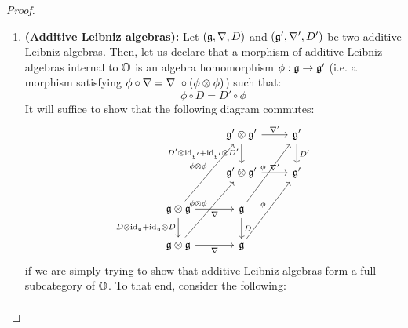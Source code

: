                     \begin{proof}
                        \noindent
                        \begin{enumerate}
                            \item \textbf{(Additive Leibniz algebras):} Let $(\g, \nabla, D)$ and $(\g', \nabla', D')$ be two additive Leibniz algebras. Then, let us declare that a morphism of additive Leibniz algebras internal to $\O$ is an algebra homomorphism $\phi: \g \to \g'$ (i.e. a morphism satisfying $\phi \circ \nabla = \nabla\ \circ (\phi \tensor \phi)$) such that:
                                $$\phi \circ D = D' \circ \phi$$
                            It will suffice to show that the following diagram commutes:
                                $$
                                    \begin{tikzcd}
                                    	& {\g' \tensor \g'} & {\g'} \\
                                    	& {\g' \tensor \g'} & {\g'} \\
                                    	{\g \tensor \g} & {\g} \\
                                    	{\g \tensor \g} & {\g}
                                    	\arrow["{\phi \tensor \phi}", from=3-1, to=1-2]
                                    	\arrow["{\phi}", from=3-2, to=1-3]
                                    	\arrow["{\phi}", from=4-2, to=2-3]
                                    	\arrow["{D'}", from=1-3, to=2-3]
                                    	\arrow["{\nabla'}", from=1-2, to=1-3]
                                    	\arrow["{D' \tensor \id_{\g'} + \id_{\g'} \tensor D'}"', from=1-2, to=2-2]
                                    	\arrow["{\nabla'}", from=2-2, to=2-3]
                                    	\arrow["{D}", from=3-2, to=4-2]
                                    	\arrow["{D \tensor \id_{\g} + \id_{\g} \tensor D}"', from=3-1, to=4-1]
                                    	\arrow["{\nabla}"', from=4-1, to=4-2]
                                    	\arrow["{\nabla}"', from=3-1, to=3-2]
                                    	\arrow["{\phi \tensor \phi}", from=4-1, to=2-2]
                                    \end{tikzcd}
                                $$
                            if we are simply trying to show that additive Leibniz algebras form a full subcategory of $\O$. To that end, consider the following:
                                $$
                                    \begin{aligned}

\end{aligned}$$
\end{enumerate}
\end{proof}
